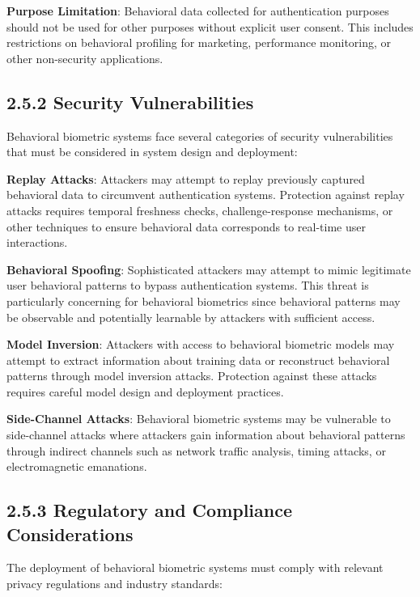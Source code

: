 \documentclass[
  12pt,
  a4paper,
]{report}
\begin{document}
\textbf{Purpose Limitation}: Behavioral data collected for
authentication purposes should not be used for other purposes without
explicit user consent. This includes restrictions on behavioral
profiling for marketing, performance monitoring, or other non-security
applications.

\subsection{2.5.2 Security
Vulnerabilities}\label{security-vulnerabilities}

Behavioral biometric systems face several categories of security
vulnerabilities that must be considered in system design and deployment:

\textbf{Replay Attacks}: Attackers may attempt to replay previously
captured behavioral data to circumvent authentication systems.
Protection against replay attacks requires temporal freshness checks,
challenge-response mechanisms, or other techniques to ensure behavioral
data corresponds to real-time user interactions.

\textbf{Behavioral Spoofing}: Sophisticated attackers may attempt to
mimic legitimate user behavioral patterns to bypass authentication
systems. This threat is particularly concerning for behavioral
biometrics since behavioral patterns may be observable and potentially
learnable by attackers with sufficient access.

\textbf{Model Inversion}: Attackers with access to behavioral biometric
models may attempt to extract information about training data or
reconstruct behavioral patterns through model inversion attacks.
Protection against these attacks requires careful model design and
deployment practices.

\textbf{Side-Channel Attacks}: Behavioral biometric systems may be
vulnerable to side-channel attacks where attackers gain information
about behavioral patterns through indirect channels such as network
traffic analysis, timing attacks, or electromagnetic emanations.

\subsection{2.5.3 Regulatory and Compliance
Considerations}\label{regulatory-and-compliance-considerations}

The deployment of behavioral biometric systems must comply with relevant
privacy regulations and industry standards:
\end{document}
